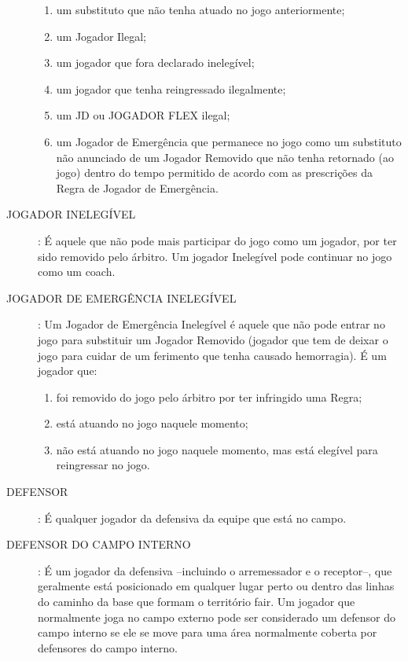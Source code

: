 \begin{description}
	\begin{enumerate}[label=\alph*)]
		\item um substituto que n\~ao tenha atuado no jogo anteriormente; 
		\item  um Jogador Ilegal; 
		\item  um jogador que fora declarado ineleg\'ivel; 
		\item  um jogador que tenha reingressado ilegalmente; 
		\item  um JD ou JOGADOR FLEX ilegal; 
		\item  um Jogador de Emerg\^encia que permanece no jogo como um substituto n\~ao anunciado de um Jogador Removido que n\~ao tenha retornado (ao jogo) dentro do tempo permitido de acordo com as prescri\c{c}\~oes da Regra de Jogador de Emerg\^encia. 
	\end{enumerate}
	
	\item[JOGADOR INELEGÍVEL]: \'E aquele que n\~ao pode mais participar do jogo como um jogador, por ter sido removido pelo \'arbitro. Um jogador Ineleg\'ivel pode continuar no jogo como um \gls{coach}. 
	
	\item[JOGADOR DE EMERGÊNCIA INELEGÍVEL]: Um Jogador de Emerg\^encia Ineleg\'ivel \'e aquele que n\~ao pode entrar no jogo para substituir um Jogador Removido (jogador que tem de deixar o jogo para cuidar de um ferimento que tenha causado hemorragia). \'E um jogador que: 
	
	\begin{enumerate}[label=\alph*)]
		\item foi removido do jogo pelo \'arbitro por ter infringido uma Regra; 
		
		\item  est\'a atuando no jogo naquele momento;
		\item n\~ao est\'a atuando no jogo naquele momento, mas est\'a eleg\'ivel para reingressar no jogo. 
	\end{enumerate}
	
	\item[DEFENSOR]: \'E qualquer jogador da defensiva da equipe que est\'a no campo. 
		
	\item[DEFENSOR DO CAMPO INTERNO]: \'E um jogador da defensiva –incluindo o arremessador e o receptor–, que geralmente est\'a posicionado em qualquer lugar perto ou dentro das linhas do caminho da base que formam o territ\'orio \gls{fair}. Um jogador que normalmente joga no campo externo pode ser considerado um defensor do campo interno se ele se move para uma \'area normalmente coberta por defensores do campo interno. 
 

\end{description}
